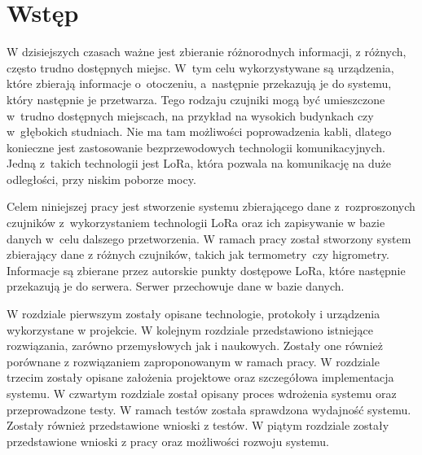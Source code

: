 
\chapter*{Wstęp} %
W dzisiejszych czasach ważne jest zbieranie różnorodnych informacji, z różnych, często trudno dostępnych miejsc. W~tym celu wykorzystywane są urządzenia, które zbierają informacje o~otoczeniu, a~następnie przekazują je do systemu, który następnie je przetwarza. Tego rodzaju czujniki mogą być umieszczone w~trudno dostępnych miejscach, na przykład na wysokich budynkach czy w~głębokich studniach. Nie ma tam możliwości poprowadzenia kabli, dlatego konieczne jest zastosowanie bezprzewodowych technologii komunikacyjnych. Jedną z~takich technologii jest LoRa, która pozwala na komunikację na duże odległości, przy niskim poborze mocy.

Celem niniejszej pracy jest stworzenie systemu zbierającego dane z~rozproszonych czujników z~wykorzystaniem technologii LoRa oraz ich zapisywanie w bazie danych w~celu dalszego przetworzenia.
W ramach pracy został stworzony system zbierający dane z różnych czujników, takich jak termometry~czy higrometry.
Informacje są zbierane przez autorskie punkty dostępowe LoRa, które następnie przekazują je do serwera.
Serwer przechowuje dane w bazie danych.

W rozdziale pierwszym zostały opisane technologie, protokoły i urządzenia wykorzystane w projekcie.
W kolejnym rozdziale przedstawiono istniejące rozwiązania, zarówno przemysłowych jak i naukowych. Zostały one również porównane z rozwiązaniem zaproponowanym w ramach pracy.
W rozdziale trzecim zostały opisane założenia projektowe oraz szczegółowa implementacja systemu.
W czwartym rozdziale został opisany proces wdrożenia systemu oraz przeprowadzone testy. W ramach testów została sprawdzona wydajność systemu. Zostały również przedstawione wnioski z testów.
W piątym rozdziale zostały przedstawione wnioski z pracy oraz możliwości rozwoju systemu.

